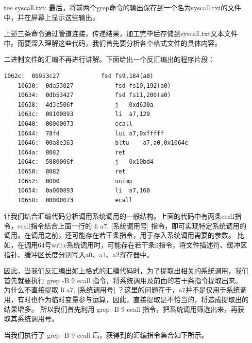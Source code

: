 tee syscall.txt: 最后，将前两个grep命令的输出保存到一个名为syscall.txt的文件中，并在屏幕上显示这些输出。

上述三条命令通过管道连接，传递结果，加工完毕后存储到syscall.txt文本文件中。而要深入理解这些代码，我们首先要分析各个格式文件的具体内容。

二进制文件的汇编不再进行讲解。下面给出一个反汇编出的程序片段：

\begin{lstlisting}[language={riscv}]
    1062c:	0b953c27          	fsd	fs9,184(a0)
    10630:	0da53027          	fsd	fs10,192(a0)
    10634:	0db53427          	fsd	fs11,200(a0)
    10638:	4d3c506f          	j	0xd630a
    1063c:	08100893          	li	a7,129
    10640:	00000073          	ecall
    10644:	78fd                lui	a7,0xfffff
    10646:	00a8e363          	bltu	a7,a0,0x1064c
    1064a:	8082                ret
    1064c:	5880006f          	j	0x10bd4
    10650:	8082                ret
    10652:	0000                unimp
    10654:	0a000893          	li	a7,160
    10658:	00000073          	ecall
\end{lstlisting}

让我们结合汇编代码分析调用系统调用的一般结构。上面的代码中有两条ecall指令，ecall指令结合上面一行的 li a7, [系统调用号] 指令，即可实现特定系统调用的调用。在调用之前，还可能存在若干条指令，用于存入系统调用需要的参数。
比如，在调用64号write系统调用时，可能存在若干条li指令，将文件描述符、缓冲区指针、缓冲区长度分别写入a0、a1、a2寄存器中。

因此，当我们反汇编出如上格式的汇编代码时，为了提取出相关的系统调用，我们首先就要执行 grep -B 9 ecall 指令，将系统调用及前面的若干条指令提取出来。
为什么不直接提取 li a7, [系统调用号] ？这里的问题在于，a7并不是仅用于系统调用，有时也作为临时变量参与运算，因此，直接提取是不恰当的，将造成提取出的结果增多。
所以我们首先利用 grep -B 9 ecall 指令，把系统调用筛选出来，再获取其系统调用号。

当我们执行了 grep -B 9 ecall 后，获得到的汇编指令集合如下所示。

